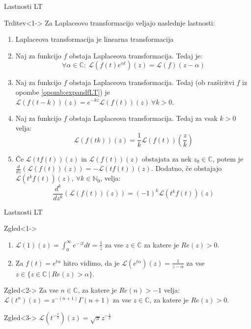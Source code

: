 \documentclass[t, 8pt]{beamer} %
\newcounter{opombe}
\newcommand{\mth}[1]{\ensuremath{\mathbb{#1}}}
\newcommand{\No}{\mth{N}_0}
\newcommand{\C}{\mth{C}}
\newcommand{\fillblack}[1]{
	\begin{tikzpicture}[remember picture, overlay]
		\node [shift={(0 cm,0cm)}]  at (current page.south west)
		{%
			\begin{tikzpicture}[remember picture, overlay] at (current page.south west)
				\draw [fill=black] (0, 0) -- (0,#1 \paperheight) --
				(\paperwidth,#1 \paperheight) -- (\paperwidth,0) -- cycle ;
			\end{tikzpicture}
		};
		\draw (current page.north west) rectangle (current page.south east);
	\end{tikzpicture}
}
\begin{document}
		\begin{frame}{Lastnosti LT}
			\begin{block}{Trditev}<1->
				Za Laplaceovo transformacijo veljajo naslednje lastnosti: \begin{enumerate}
					\item Laplaceova transformacija je linearna transformacija
					\item Naj za funkcijo $f$ obstaja Laplaceova transformacija. Tedaj je: $$\forall \alpha\in\C:~\mathcal{L}(f(t)e^{\alpha t})(z) = \mathcal{L}(f)(z-\alpha)$$
					\item Naj za funkcijo $f$ obstaja Laplaceova transformacija. Tedaj (ob razširitvi $f$ iz opombe \ref{opomb:expandfLT}) je $\mathcal{L}(f(t-k))(z) = e^{-kz}\mathcal{L}(f(t))(z)~\forall k > 0$.
					\item Naj za funkcijo $f$ obstaja Laplaceova transformacija. Tedaj za vsak $k>0$ velja: $$\mathcal{L}(f(tk))(z) = \frac{1}{k}\mathcal{L}(f(t))(\frac{z}{k})$$
					\item Če $\mathcal{L}(tf(t))(z)$ in $\mathcal{L}(f(t))(z)$ obstajata za nek $z_0\in\C$, potem je $\frac{d}{dz}(\mathcal{L}(f(t))(z)) = -\mathcal{L}(tf(t))(z)$. Dodatno, če obstajajo $\mathcal{L}(t^kf(t))(z),~\forall k\in\No$, velja: $$\frac{d^k}{dz^k}(\mathcal{L}(f(t))(z)) = (-1)^k\mathcal{L}(t^kf(t))(z)$$
				\end{enumerate}
			\end{block}
		\end{frame}
		
		\begin{frame}{Lastnosti LT}
			\begin{block}{Zgled}<1->
				\begin{enumerate}
				\item $\mathcal{L}(1)(z) = \int_{0}^{\infty}e^{-zt}dt = \frac{1}{z}$ za vse $z\in\C$ za katere je $Re(z) > 0$. \item Za $f(t) = e^{t\alpha}$ hitro vidimo, da je $\mathcal{L}(e^{t\alpha})(z) = \frac{1}{z-\alpha}$ za vse $z\in \{z\in\C~|~Re(z) > \alpha\}$.
				\end{enumerate}
			\end{block}
			\begin{block}{Zgled}<2->
				Za vse $n\in\C$, za katere je $Re(n)>-1$ velja: $\mathcal{L}(t^n)(z)=z^{-(n+1)}\Gamma(n+1)$ za vse $z\in\C$, za katere je $Re(z) > 0$.
			\end{block}
			\begin{block}{Zgled}<3->
				$\mathcal{L}(t^{-\frac{1}{2}})(z) = \sqrt{\pi}z^{-\frac{1}{2}}$
			\end{block}
		\end{frame}
		
\end{document}

